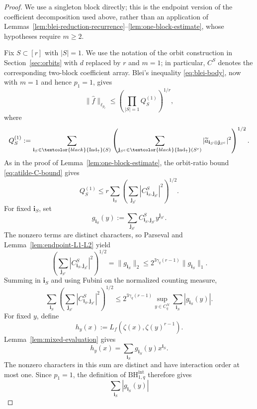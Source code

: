 \documentclass[11pt,a4paper]{article}
\numberwithin{equation}{section}
\theoremstyle{cleanplain}
\theoremstyle{cleandefinition}
\theoremstyle{cleanremark}
\newcommand{\Indup}{\textcolor{black}{\operatorname{Ind}_{\uparrow}}}
\newcommand{\BHint}[2]{\mathrm{BH}^{\mathrm{int}}_{#1,#2}}
\begin{document}
\begin{proof}
We use a singleton block directly; this is the endpoint version of the
coefficient decomposition used above, rather than an application of
Lemmas~\ref{lem:blei-reduction-recurrence}--\ref{lem:one-block-estimate}, whose
hypotheses require $m\geq2$.

Fix $S\subset[r]$ with $|S|=1$.  We use the notation of the orbit
construction in Section~\ref{sec:orbits} with $d$ replaced by $r$ and
$m=1$; in particular, $C^S$ denotes the corresponding two-block coefficient
array.  Blei's inequality
\eqref{eq:blei-body}, now with $m=1$ and hence $p_1=1$, gives
\begin{equation}\label{eq:coarse-Blei-singleton}
 \|\widehat f\|_{\ell_{p_r}}
 \leq
 \left(
 \prod_{|S|=1} Q_S^{(1)}
 \right)^{1/r},
\end{equation}
where
\[
 Q_S^{(1)}:=
 \sum_{\mathbf i_S\in\Indup(S)}
 \left(
 \sum_{\mathbf j_{S^c}\in\Indup(S^c)}
 |\widetilde a_{\mathbf i_S\oplus\mathbf j_{S^c}}|^2
 \right)^{1/2}.
\]
As in the proof of Lemma~\ref{lem:one-block-estimate}, the orbit-ratio bound
\eqref{eq:atilde-C-bound} gives
\begin{equation}\label{eq:coarse-orbit-singleton}
 Q_S^{(1)}
 \leq r
 \sum_{\mathbf i_S}
 \left(
 \sum_{\mathbf j_{S^c}}
 |C^S_{\mathbf i_S,\mathbf j_{S^c}}|^2
 \right)^{1/2}.
\end{equation}
For fixed $\mathbf i_S$, set
\[
 g_{\mathbf i_S}(y)
 :=\sum_{\mathbf j_{S^c}}
 C^S_{\mathbf i_S,\mathbf j_{S^c}}y^{\mathbf j_{S^c}}.
\]
The nonzero terms are distinct characters, so Parseval and
Lemma~\ref{lem:endpoint-L1-L2} yield
\[
 \left(
 \sum_{\mathbf j_{S^c}}
 |C^S_{\mathbf i_S,\mathbf j_{S^c}}|^2
 \right)^{1/2}
 =\|g_{\mathbf i_S}\|_2
 \leq
 2^{3\gamma_q(r-1)}\|g_{\mathbf i_S}\|_1.
\]
Summing in $\mathbf i_S$ and using Fubini on the normalized counting measure,
\begin{equation}\label{eq:coarse-Fubini-singleton}
 \sum_{\mathbf i_S}
 \left(
 \sum_{\mathbf j_{S^c}}
 |C^S_{\mathbf i_S,\mathbf j_{S^c}}|^2
 \right)^{1/2}
 \leq
 2^{3\gamma_q(r-1)}
 \sup_{y\in C_q^N}\sum_{\mathbf i_S}|g_{\mathbf i_S}(y)|.
\end{equation}
For fixed $y$, define
\[
 h_y(x):=L_f(\zeta(x),\zeta(y)^{r-1}).
\]
Lemma~\ref{lem:mixed-evaluation} gives
\[
 h_y(x)=\sum_{\mathbf i_S}g_{\mathbf i_S}(y)x^{\mathbf i_S}.
\]
The nonzero characters in this sum are distinct and have interaction order at
most one.  Since $p_1=1$, the definition of $\BHint{1}{q}$ therefore gives
\[
 \sum_{\mathbf i_S}|g_{\mathbf i_S}(y)|
\]
\end{proof}
\end{document}
